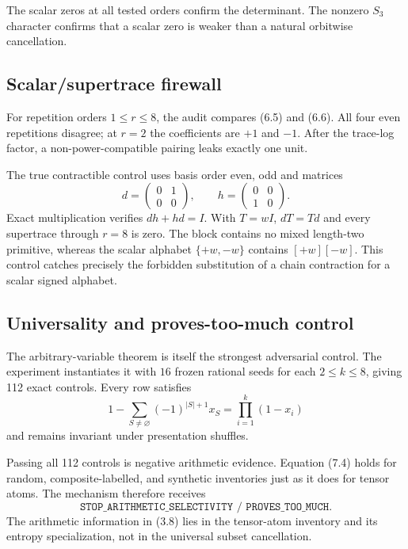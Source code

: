 The scalar zeros at all tested orders confirm the determinant.  The nonzero
$S_3$ character confirms that a scalar zero is weaker than a natural
orbitwise cancellation.

\subsection{Scalar/supertrace firewall}

For repetition orders $1\le r\le8$, the audit compares (6.5) and (6.6).
All four even repetitions disagree; at $r=2$ the coefficients are $+1$ and
$-1$.  After the trace-log factor, a non-power-compatible pairing leaks
exactly one unit.

The true contractible control uses basis order even, odd and matrices
\[
  d=\begin{pmatrix}0&1\\0&0\end{pmatrix},
  \qquad
  h=\begin{pmatrix}0&0\\1&0\end{pmatrix}.
  \tag{7.3}
\]
Exact multiplication verifies $dh+hd=I$.  With $T=wI$, $dT=Td$ and every
supertrace through $r=8$ is zero.  The block contains no mixed length-two
primitive, whereas the scalar alphabet $\{+w,-w\}$ contains
$[+w][-w]$.  This control catches precisely the forbidden substitution of a
chain contraction for a scalar signed alphabet.

\subsection{Universality and proves-too-much control}

The arbitrary-variable theorem is itself the strongest adversarial control.
The experiment instantiates it with $16$ frozen rational seeds for each
$2\le k\le8$, giving 112 exact controls.  Every row satisfies
\[
  1-\sum_{S\ne\varnothing}(-1)^{|S|+1}x_S
  =\prod_{i=1}^k(1-x_i)
  \tag{7.4}
\]
and remains invariant under presentation shuffles.

Passing all 112 controls is negative arithmetic evidence.  Equation (7.4)
holds for random, composite-labelled, and synthetic inventories just as it
does for tensor atoms.  The mechanism therefore receives
\[
  \texttt{STOP\_ARITHMETIC\_SELECTIVITY / PROVES\_TOO\_MUCH}.
  \tag{7.5}
\]
The arithmetic information in (3.8) lies in the tensor-atom inventory and its
entropy specialization, not in the universal subset cancellation.

